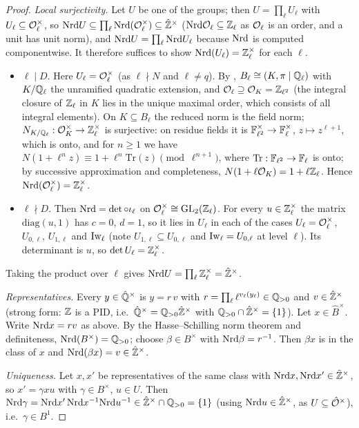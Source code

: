 \begin{proof}
\emph{Local surjectivity.} Let $U$ be one of the groups; then $U=\prod_\ell U_\ell$ with $U_\ell\subseteq\mathcal{O}_\ell^\times$, so
$\mathrm{Nrd} U\subseteq\prod_\ell\mathrm{Nrd}(\mathcal{O}_\ell^\times)\subseteq\hat{\mathbb{Z}}^\times$ ($\mathrm{Nrd}\mathcal{O}_\ell\subseteq\mathbb{Z}_\ell$ as $\mathcal{O}_\ell$ is an order, and a unit has
unit norm), and $\mathrm{Nrd} U=\prod_\ell\mathrm{Nrd} U_\ell$ because $\mathrm{Nrd}$ is computed componentwise. It therefore suffices to show
$\mathrm{Nrd}(U_\ell)=\mathbb{Z}_\ell^\times$ for each $\ell$.
\begin{itemize}
\item $\ell\mid D$. Here $U_\ell=\mathcal{O}_\ell^\times$ (as $\ell\nmid N$ and $\ell\ne q$). By
, $B_\ell\cong(K,\pi\mid\mathbb{Q}_\ell)$ with $K/\mathbb{Q}_\ell$ the unramified
quadratic extension, and $\mathcal{O}_\ell\supseteq\mathcal{O}_K=\mathbb{Z}_{\ell^2}$ (the integral closure of $\mathbb{Z}_\ell$ in $K$ lies in the unique maximal order, which
consists of all integral elements). On $K\subseteq B_\ell$ the reduced norm is the field norm; $N_{K/\mathbb{Q}_\ell}:\mathcal{O}_K^\times\to\mathbb{Z}_\ell^\times$ is
surjective: on residue fields it is $\mathbb{F}_{\ell^2}^\times\to\mathbb{F}_\ell^\times$, $z\mapsto z^{\ell+1}$, which is onto, and for
$n\ge1$ we have $N(1+\ell^nz)\equiv1+\ell^n\mathrm{Tr}(z)\pmod{\ell^{n+1}}$, where $\mathrm{Tr}:\mathbb{F}_{\ell^2}\to\mathbb{F}_\ell$ is onto;
by successive approximation and completeness, $N(1+\ell\mathcal{O}_K)=1+\ell\mathbb{Z}_\ell$.
Hence $\mathrm{Nrd}(\mathcal{O}_\ell^\times)=\mathbb{Z}_\ell^\times$.
\item $\ell\nmid D$. Then $\mathrm{Nrd}=\det\circ\iota_\ell$ on $\mathcal{O}_\ell^\times\cong\mathrm{GL}_2(\mathbb{Z}_\ell)$. For every $u\in\mathbb{Z}_\ell^\times$ the matrix
$\mathrm{diag}(u,1)$ has $c=0$, $d=1$, so it lies in $U_\ell$ in each of the cases $U_\ell=\mathcal{O}_\ell^\times$, $U_{0,\ell}$, $U_{1,\ell}$ and
$\mathrm{Iw}_\ell$ (note $U_{1,\ell}\subseteq U_{0,\ell}$ and $\mathrm{Iw}_\ell=U_{0,\ell}$ at level $\ell$). Its determinant is $u$, so $\det U_\ell=\mathbb{Z}_\ell^\times$.
\end{itemize}
Taking the product over $\ell$ gives $\mathrm{Nrd} U=\prod_\ell\mathbb{Z}_\ell^\times=\hat{\mathbb{Z}}^\times$.

\emph{Representatives.} Every $y\in\hat{\mathbb{Q}}^\times$ is $y=r\,v$ with $r=\prod_\ell\ell^{v_\ell(y_\ell)}\in\mathbb{Q}_{>0}$ and $v\in\hat{\mathbb{Z}}^\times$
(strong form: $\mathbb{Z}$ is a PID, i.e.\ $\hat{\mathbb{Q}}^\times=\mathbb{Q}_{>0}\hat{\mathbb{Z}}^\times$ with $\mathbb{Q}_{>0}\cap\hat{\mathbb{Z}}^\times=\{1\}$). Let $x\in\hat B^\times$.
Write $\mathrm{Nrd} x=rv$ as above. By the Hasse--Schilling norm theorem
 and definiteness, $\mathrm{Nrd}(B^\times)=\mathbb{Q}_{>0}$; choose $\beta\in B^\times$ with
$\mathrm{Nrd}\beta=r^{-1}$. Then $\beta x$ is in the class of $x$ and $\mathrm{Nrd}(\beta x)=v\in\hat{\mathbb{Z}}^\times$.

\emph{Uniqueness.} Let $x,x'$ be representatives of the same class with $\mathrm{Nrd} x,\mathrm{Nrd} x'\in\hat{\mathbb{Z}}^\times$, so $x'=\gamma xu$ with $\gamma\in B^\times$,
$u\in U$. Then $\mathrm{Nrd}\gamma=\mathrm{Nrd} x'\,\mathrm{Nrd} x^{-1}\mathrm{Nrd} u^{-1}\in\hat{\mathbb{Z}}^\times\cap\mathbb{Q}_{>0}=\{1\}$ (using $\mathrm{Nrd} u\in\hat{\mathbb{Z}}^\times$, as $U\subseteq\hat{\mathcal{O}}^\times$),
i.e.\ $\gamma\in B^1$.
\end{proof}
